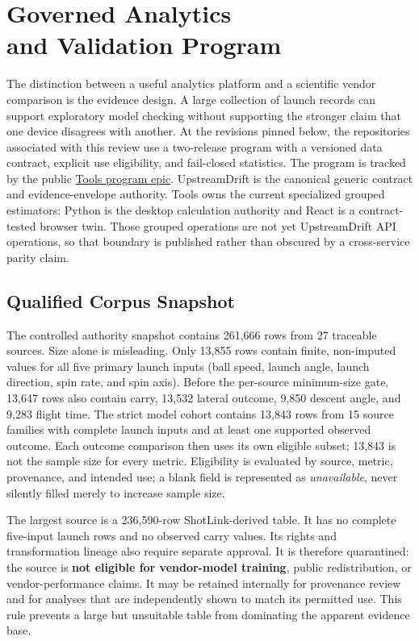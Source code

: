 \chapter[Governed Analytics and Validation Program]{Governed Analytics\\and Validation Program}
\label{ch:validation-program}

The distinction between a useful analytics platform and a scientific
vendor comparison is the evidence design. A large collection of launch
records can support exploratory model checking without supporting the
stronger claim that one device disagrees with another.
At the revisions pinned below, the repositories associated with this review use a two-release program with a
versioned data contract, explicit use eligibility, and fail-closed
statistics. The program is tracked by the public
\href{https://github.com/D-sorganization/Tools/issues/4583}{Tools program
epic}. UpstreamDrift is the canonical generic contract and evidence-envelope
authority. Tools owns the current specialized grouped estimators: Python is
the desktop calculation authority and React is a contract-tested browser twin.
Those grouped operations are not yet UpstreamDrift API operations, so that
boundary is published rather than obscured by a cross-service parity claim.

\section{Qualified Corpus Snapshot}

The controlled authority snapshot contains 261,666 rows from 27 traceable
sources. Size alone is misleading. Only 13,855 rows contain finite,
non-imputed values for all five primary launch inputs (ball speed, launch
angle, launch direction, spin rate, and spin axis). Before the per-source
minimum-size gate, 13,647 rows also contain carry, 13,532 lateral outcome,
9,850 descent angle, and 9,283 flight time. The strict model cohort contains
13,843 rows from 15 source families with complete launch inputs and at least one supported observed outcome.
Each outcome comparison then uses its own eligible subset; 13,843 is not the sample size for every metric.
Eligibility is evaluated by source, metric, provenance,
and intended use; a blank field is represented as \emph{unavailable}, never
silently filled merely to increase sample size.

The largest source is a 236,590-row ShotLink-derived table. It has no
complete five-input launch rows and no observed carry values. Its rights and
transformation lineage also require separate approval. It is therefore
quarantined: the source is \textbf{not eligible for vendor-model training},
public redistribution, or vendor-performance claims. It may be retained
internally for provenance review and for analyses that are independently
shown to match its permitted use. This rule prevents a large but unsuitable
table from dominating the apparent evidence base.

